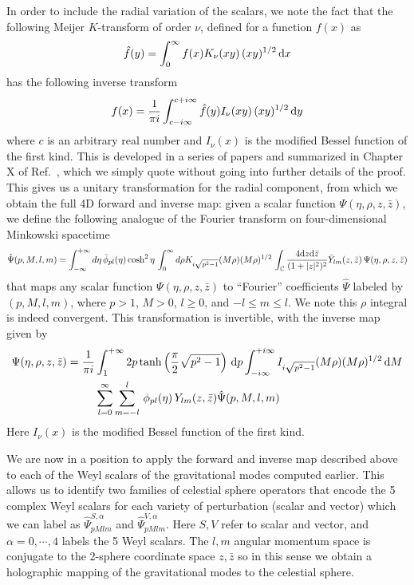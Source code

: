 \documentclass{brownthesis}
\def\dd{{\rm d}}
\begin{document}
In order to include the radial variation of the scalars, we note the
fact that the following Meijer $K$-transform of order $\nu$, defined
for a function $f(x)$ as
\[
\hat{f}(y)=\int_{0}^{\infty}f(x)K_{\nu}(xy)\,(xy)^{1/2}\,\dd x
\]
has the following inverse transform
\[
f(x)=\frac{1}{\pi i}\int_{c-i\infty}^{c+i\infty}\hat{f}(y)I_{\nu}(xy)\,(xy)^{1/2}\,\dd y
\]
where $c$ is an arbitrary real number and $I_{\nu}(x)$ is the modified
Bessel function of the first kind. This is developed in a series of
papers \cite{meijer1940a,meijer1940b,Boas1942a,Boas1942b} and summarized
in Chapter X of Ref.~\cite{bateman1954tables}, which we simply quote
without going into further details of the proof. This gives us a unitary
transformation for the radial component, from which we obtain the
full 4D forward and inverse map: given a scalar function $\Psi(\eta,\rho,z,\bar{z})$,
we define the following analogue of the Fourier transform on four-dimensional
Minkowski spacetime
\begin{equation}
\hat{\Psi}(p,M,l,m)=\int_{-\infty}^{+\infty}d\eta\,\bar{\phi}_{pl}(\eta)\cosh^{2}\eta\,\int_{0}^{\infty}d\rho K_{i\sqrt{p^{2}-1}}(M\rho)(M\rho)^{1/2}\,\int_{\mathbb{C}}\frac{4\dd z\dd\bar{z}}{(1+|z|^{2})^{2}}\bar{Y}_{lm}(z,\bar{z})\,\Psi(\eta,\rho,z,\bar{z})\label{eq:forwardmap}
\end{equation}
that maps any scalar function $\Psi(\eta,\rho,z,\bar{z})$ to ``Fourier''
coefficients $\hat{\Psi}$ labeled by $(p,M,l,m)$, where $p>1$,
$M>0$, $l\ge0$, and $-l\le m\le l$. We note this $\rho$ integral
is indeed convergent. This transformation is invertible, with the
inverse map given by
\begin{align}
\Psi(\eta,\rho,z,\bar{z})={}\frac{1}{\pi i} & \int_{1}^{+\infty}2p\tanh\left(\frac{\pi}{2}\sqrt{p^{2}-1}\right)\,\dd p\int_{-i\infty}^{+i\infty}I_{i\sqrt{p^{2}-1}}(M\rho)(M\rho)^{1/2}\,\dd M\nonumber \\
 & \sum_{l=0}^{\infty}\sum_{m=-l}^{l}\,\phi_{pl}(\eta)\,Y_{lm}(z,\bar{z})\hat{\Psi}(p,M,l,m)\label{eq:inversemap}
\end{align}
Here $I_{\nu}(x)$ is the modified Bessel function of the first kind.

We are now in a position to apply the forward and inverse map described
above to each of the Weyl scalars of the gravitational modes computed
earlier. This allows us to identify two families of celestial sphere
operators that encode the 5 complex Weyl scalars for each variety
of perturbation (scalar and vector) which we can label as $\hat{\Psi}_{pMlm}^{S,\alpha}$
and $\hat{\Psi}_{pMlm}^{V,\alpha}$. Here $S,V$ refer to scalar and
vector, and $\alpha=0,\cdots,4$ labels the 5 Weyl scalars. The $l,m$
angular momentum space is conjugate to the 2-sphere coordinate space
$z,\bar{z}$ so in this sense we obtain a holographic mapping of the
gravitational modes to the celestial sphere.
\end{document}
